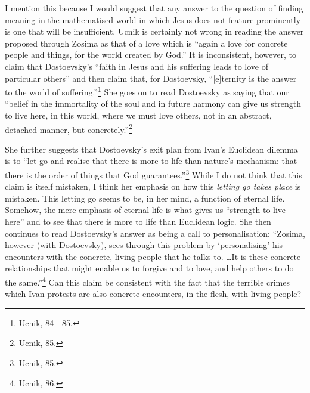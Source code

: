 \documentclass[12pt]{article}
\begin{document}
	I mention this because I would suggest that any answer to the question of finding meaning in the mathematised world in which Jesus does not feature prominently is one that will be insufficient. Ucnik is certainly not wrong in reading the answer proposed through Zosima as that of a love which is ``again a love for concrete people and things, for the world created by God.'' It is inconsistent, however, to claim that Dostoevsky's ``faith in Jesus and his suffering leads to love of particular others'' and then claim that, for Dostoevsky, ``[e]ternity is the answer to the world of suffering.''\footnote{Ucnik, 84 - 85.} She goes on to read Dostoevsky as saying that our ``belief in the immortality of the soul and in future harmony can give us strength to live here, in this world, where we must love others, not in an abstract, detached manner, but concretely.''\footnote{Ucnik, 85.} 
	
	She further suggests that Dostoevsky's exit plan from Ivan's Euclidean dilemma is to ``let go and realise that there is more to life than nature's mechanism: that there is the order of things that God guarantees.''\footnote{Ucnik, 85.} While I do not think that this claim is itself mistaken, I think her emphasis on how this \emph{letting go takes place} is mistaken. This letting go seems to be, in her mind, a function of eternal life. Somehow, the mere emphasis of eternal life is what gives us ``strength to live here'' and to see that there is more to life than Euclidean logic. She then continues to read Dostoevsky's answer as being a call to personalisation: ``Zosima, however (with Dostoevsky), sees through this problem by `personalising' his encounters with the concrete, living people that he talks to. \ldots It is these concrete relationships that might enable us to forgive and to love, and help others to do the same.''\footnote{Ucnik, 86.} Can this claim be consistent with the fact that the terrible crimes which Ivan protests are also concrete encounters, in the flesh, with living people?
	
\end{document}
